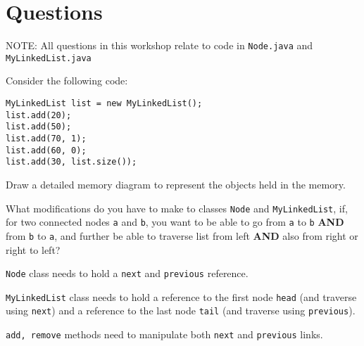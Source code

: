 \section*{Questions}
NOTE: All questions in this workshop relate to code in \texttt{Node.java} and \texttt{MyLinkedList.java}

\begin{questions}
\question Consider the following code:

\begin{lstlisting}
MyLinkedList list = new MyLinkedList();
list.add(20);
list.add(50);
list.add(70, 1);
list.add(60, 0);
list.add(30, list.size());
\end{lstlisting}

Draw a detailed memory diagram to represent the objects held in the memory.

\ifprintanswers
{}
\else
\fi

\question What modifications do you have to make to classes \texttt{Node}  and \texttt{MyLinkedList}, if, for two connected nodes \texttt{a} and \texttt{b}, you want to be able to go from \texttt{a} to \texttt{b} \textbf{AND} from \texttt{b} to \texttt{a}, and further be able to traverse list from left \textbf{AND} also from right or right to left?

\ifprintanswers
\texttt{Node} class needs to hold a \texttt{next} and \texttt{previous} reference.

\texttt{MyLinkedList} class needs to hold a reference to the first node \texttt{head} (and traverse using \texttt{next}) and a reference to the last node \texttt{tail} (and traverse using \texttt{previous}).

\texttt{add, remove} methods need to manipulate both \texttt{next} and \texttt{previous} links.
\else
\fi


\end{questions}
